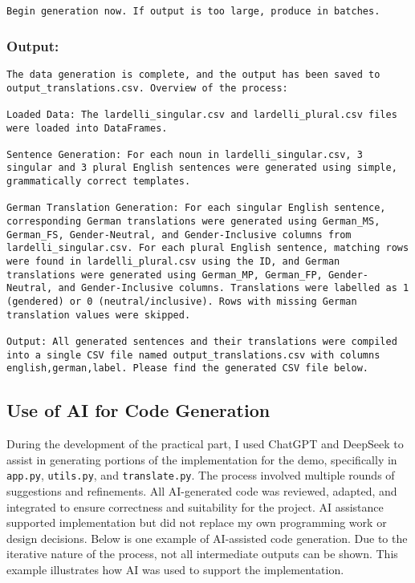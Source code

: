 \begin{appendices}
\begin{lstlisting}
Begin generation now. If output is too large, produce in batches.

\end{lstlisting}

\subsubsection{Output: } 
\begin{lstlisting}
The data generation is complete, and the output has been saved to output_translations.csv. Overview of the process:

Loaded Data: The lardelli_singular.csv and lardelli_plural.csv files were loaded into DataFrames.

Sentence Generation: For each noun in lardelli_singular.csv, 3 singular and 3 plural English sentences were generated using simple, grammatically correct templates.

German Translation Generation: For each singular English sentence, corresponding German translations were generated using German_MS, German_FS, Gender-Neutral, and Gender-Inclusive columns from lardelli_singular.csv. For each plural English sentence, matching rows were found in lardelli_plural.csv using the ID, and German translations were generated using German_MP, German_FP, Gender-Neutral, and Gender-Inclusive columns. Translations were labelled as 1 (gendered) or 0 (neutral/inclusive). Rows with missing German translation values were skipped.

Output: All generated sentences and their translations were compiled into a single CSV file named output_translations.csv with columns english,german,label. Please find the generated CSV file below.

\end{lstlisting}

\subsection{Use of AI for Code Generation}\label{appendix:ai_code}
During the development of the practical part, I used ChatGPT and DeepSeek to assist in generating portions of the implementation for the demo, specifically in \texttt{app.py}, \texttt{utils.py}, and \texttt{translate.py}. The process involved multiple rounds of suggestions and refinements. All AI-generated code was reviewed, adapted, and integrated to ensure correctness and suitability for the project. AI assistance supported implementation but did not replace my own programming work or design decisions. Below is one example of AI-assisted code generation. Due to the iterative nature of the process, not all intermediate outputs can be shown. This example illustrates how AI was used to support the implementation.



\end{appendices}
